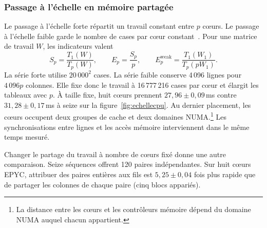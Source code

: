 \subsubsection{Passage à l’échelle en mémoire partagée}
Le passage à l'échelle forte répartit un travail constant entre \(p\) cœurs. Le passage à l'échelle faible garde le nombre de cases par cœur constant~\cite{amdahl,gustafson}. Pour une matrice de travail \(W\), les indicateurs valent
\[
 S_p=\frac{T_1(W)}{T_p(W)},\qquad E_p=\frac{S_p}{p},\qquad
 E_p^{\mathrm{weak}}=\frac{T_1(W_1)}{T_p(pW_1)}.
\]
La série forte utilise \(20\,000^2\) cases. La série faible conserve 4\,096 lignes pour \(4\,096p\) colonnes. Elle fixe donc le travail à 16\,777\,216 cases par cœur et élargit les tableaux avec \(p\).
À taille fixe, huit cœurs prennent \(27{,}96\pm0{,}09\)\,ms contre \(31{,}28\pm0{,}17\)\,ms à seize sur la figure~\ref{fig:echellecpu}. Au dernier placement, les cœurs occupent deux groupes de cache et deux domaines NUMA.\footnote{La distance entre les cœurs et les contrôleurs mémoire dépend du domaine NUMA auquel chacun appartient.} Les synchronisations entre lignes et les accès mémoire interviennent dans le même temps mesuré.

Changer le partage du travail à nombre de cœurs fixé donne une autre comparaison. Seize séquences offrent 120 paires indépendantes. Sur huit cœurs EPYC, attribuer des paires entières aux fils est \(5{,}25\pm0{,}04\) fois plus rapide que de partager les colonnes de chaque paire (cinq blocs appariés).

